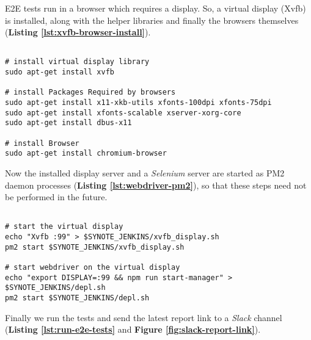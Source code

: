 E2E tests run in a browser which requires a display. So, a virtual display (Xvfb) is installed, along with the helper libraries and finally the browsers themselves (\textbf{Listing \ref{lst:xvfb-browser-install}}).\\

\begin{listing}[H]
\begin{verbatim}

# install virtual display library
sudo apt-get install xvfb

# install Packages Required by browsers
sudo apt-get install x11-xkb-utils xfonts-100dpi xfonts-75dpi
sudo apt-get install xfonts-scalable xserver-xorg-core
sudo apt-get install dbus-x11

# install Browser
sudo apt-get install chromium-browser

\end{verbatim}
\label{lst:xvfb-browser-install}
\end{listing}

Now the installed display server and a \textit{Selenium} server are started as PM2 daemon processes  (\textbf{Listing \ref{lst:webdriver-pm2}}), so that these steps need not be performed in the future.\\

\begin{listing}[H]
\begin{verbatim}

# start the virtual display
echo "Xvfb :99" > $SYNOTE_JENKINS/xvfb_display.sh
pm2 start $SYNOTE_JENKINS/xvfb_display.sh

# start webdriver on the virtual display
echo "export DISPLAY=:99 && npm run start-manager" > $SYNOTE_JENKINS/depl.sh
pm2 start $SYNOTE_JENKINS/depl.sh

\end{verbatim}
\label{lst:webdriver-pm2}
\end{listing}

Finally we run the tests and send the latest report link to a \textit{Slack} channel (\textbf{Listing \ref{lst:run-e2e-tests}} and \textbf{Figure \ref{fig:slack-report-link}}).\\

